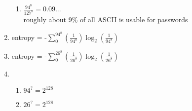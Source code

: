 \documentclass{assignment}
\begin{document}
\begin{problemlist}
\begin{problem}
\begin{answer}
\begin{enumerate}[label=(\alph*)]
\begin{enumerate}[label=(\roman*)]
			\item $\frac{94^8}{127^8} = 0.09... $ \\
				  roughly about 9\% of all ASCII is usable for passwords
			\end{enumerate}
	\item entropy = -$\sum_{0}^{94^8} (\frac{1}{94^8})  \log_2(\frac{1}{94^8})$ 
	\item entropy = -$\sum_{0}^{26^8} (\frac{1}{26^8})  \log_2(\frac{1}{26^8})$
	\item 	\begin{enumerate}[label=(\roman*)]
			\item $94^? = 2^{128}$
			\item $26^? = 2^{128}$
			\end{enumerate}
\end{enumerate}
\end{answer}
\end{problem}

\end{problemlist}
\end{document}
